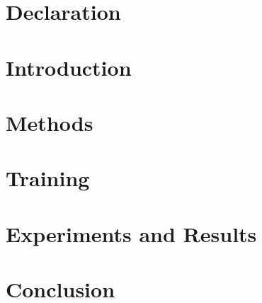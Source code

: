 \documentclass[a4paper,12pt,headsepline, fleqn, english]{scrartcl}%
\begin{document}
	
	
	
	\newpage
	
	\section{Declaration}
	
	\newpage
	
	\setcounter{page}{1}
	
	\thispagestyle{empty}
	\tableofcontents
	
	\newpage
	
	
	\section{Introduction}
	
	\section{Methods}
	
	\section{Training}
	
	\section{Experiments and Results}
	
	\section{Conclusion}
	
	\newpage	
	
	\printbibliography
\end{document}
